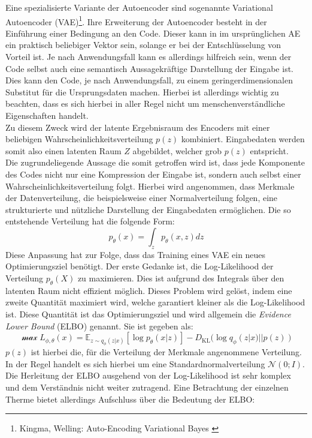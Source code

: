 Eine spezialisierte Variante der Autoencoder sind sogenannte Variational Autoencoder (VAE)\footnote{
    Kingma, Welling: Auto-Encoding Variational Bayes
    \cite{kingma2013auto}
}. Ihre Erweiterung der Autoencoder besteht in der Einführung einer Bedingung an den Code. Dieser kann in im ursprünglichen AE ein praktisch beliebiger Vektor sein, solange er bei der Entschlüsselung von Vorteil ist. Je nach Anwendungsfall kann es allerdings hilfreich sein, wenn der Code selbst auch eine semantisch Aussagekräftige Darstellung der Eingabe ist. Dies kann den Code, je nach Anwendungsfall, zu einem geringerdimensionalen Substitut für die Ursprungsdaten machen. Hierbei ist allerdings wichtig zu beachten, dass es sich hierbei in aller Regel nicht um menschenverständliche Eigenschaften handelt. \\
Zu diesem Zweck wird der latente Ergebnisraum des Encoders mit einer beliebigen Wahrscheinlichkeitsverteilung $p(z)$ kombiniert. Eingabedaten werden somit also einen latenten Raum $Z$ abgebildet, welcher grob $p(z)$ entspricht. \\
Die zugrundeliegende Aussage die somit getroffen wird ist, dass jede Komponente des Codes nicht nur eine Kompression der Eingabe ist, sondern auch selbst einer Wahrscheinlichkeitsverteilung folgt. Hierbei wird angenommen, dass Merkmale der Datenverteilung, die beispielsweise einer Normalverteilung folgen, eine strukturierte und nützliche Darstellung der Eingabedaten ermöglichen. Die so entstehende Verteilung hat die folgende Form:
\begin{equation}
    p_\theta(x) = \int_z p_\theta(x, z) dz
\end{equation}
Diese Anpassung hat zur Folge, dass das Training eines VAE ein neues Optimierungsziel benötigt. Der erste Gedanke ist, die Log-Likelihood der Verteilung $p_\theta(X)$ zu maximieren. Dies ist aufgrund des Integrals über den latenten Raum nicht effizient möglich. Dieses Problem wird gelöst, indem eine zweite Quantität maximiert wird, welche garantiert kleiner als die Log-Likelihood ist. Diese Quantität ist das Optimierungsziel und wird allgemein die \textit{Evidence Lower Bound} (ELBO) genannt. Sie ist gegeben als:
\begin{equation}
    \mathcal \max L_{\phi, \theta}(x) = \mathbb E_{z \sim q_{\phi}(z|x)}
    \left [
        \log p_\theta(x|z)
    \right ]
    - D_\text{KL} (\log q_{\phi}(z|x) || p(z))
\end{equation}
$p(z)$ ist hierbei die, für die Verteilung der Merkmale angenommene Verteilung. In der Regel handelt es sich hierbei um eine Standardnormalverteilung $\mathcal N(0; I)$. Die Herleitung der ELBO ausgehend von der Log-Likelihood ist sehr komplex und dem Verständnis nicht weiter zutragend. Eine Betrachtung der einzelnen Therme bietet allerdings Aufschluss über die Bedeutung der ELBO:
